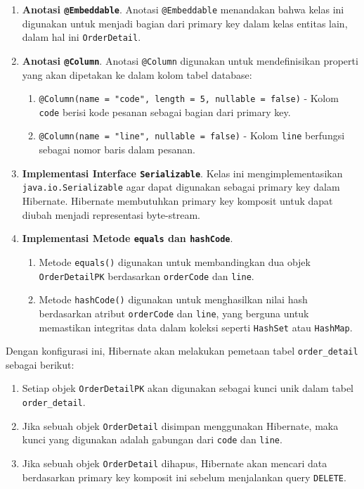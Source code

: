 \begin{enumerate}
	\item \textbf{Anotasi \texttt{@Embeddable}}. 
	Anotasi \texttt{@Embeddable} menandakan bahwa kelas ini digunakan untuk menjadi bagian dari primary key dalam kelas entitas lain, dalam hal ini \texttt{OrderDetail}.
	
	\item \textbf{Anotasi \texttt{@Column}}. 
	Anotasi \texttt{@Column} digunakan untuk mendefinisikan properti yang akan dipetakan ke dalam kolom tabel database:
	\begin{enumerate}
		\item \texttt{@Column(name = "code", length = 5, nullable = false)} - Kolom \texttt{code} berisi kode pesanan sebagai bagian dari primary key.
		\item \texttt{@Column(name = "line", nullable = false)} - Kolom \texttt{line} berfungsi sebagai nomor baris dalam pesanan.
	\end{enumerate}
	
	\item \textbf{Implementasi Interface \texttt{Serializable}}. 
	Kelas ini mengimplementasikan \texttt{java.io.Serializable} agar dapat digunakan sebagai primary key dalam Hibernate. Hibernate membutuhkan primary key komposit untuk dapat diubah menjadi representasi byte-stream.
	
	\item \textbf{Implementasi Metode \texttt{equals} dan \texttt{hashCode}}. 
	\begin{enumerate}
		\item Metode \texttt{equals()} digunakan untuk membandingkan dua objek \texttt{OrderDetailPK} berdasarkan \texttt{orderCode} dan \texttt{line}.
		\item Metode \texttt{hashCode()} digunakan untuk menghasilkan nilai hash berdasarkan atribut \texttt{orderCode} dan \texttt{line}, yang berguna untuk memastikan integritas data dalam koleksi seperti \texttt{HashSet} atau \texttt{HashMap}.
	\end{enumerate}
\end{enumerate}

Dengan konfigurasi ini, Hibernate akan melakukan pemetaan tabel \texttt{order\_detail} sebagai berikut:
\begin{enumerate}
	\item Setiap objek \texttt{OrderDetailPK} akan digunakan sebagai kunci unik dalam tabel \texttt{order\_detail}.
	\item Jika sebuah objek \texttt{OrderDetail} disimpan menggunakan Hibernate, maka kunci yang digunakan adalah gabungan dari \texttt{code} dan \texttt{line}.
	\item Jika sebuah objek \texttt{OrderDetail} dihapus, Hibernate akan mencari data berdasarkan primary key komposit ini sebelum menjalankan query \texttt{DELETE}.
\end{enumerate}

